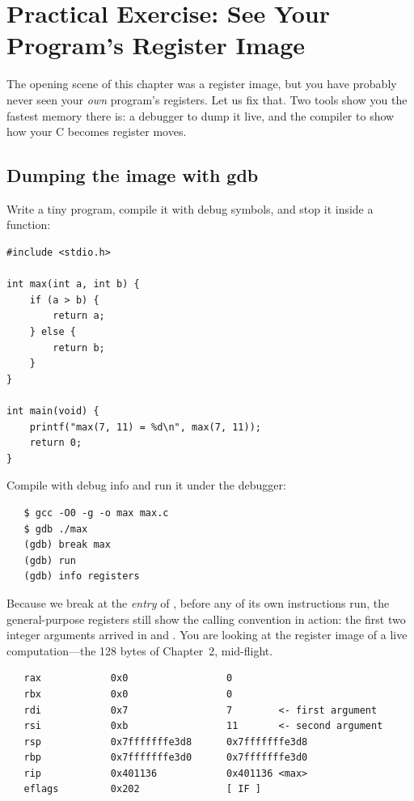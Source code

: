 \section{Practical Exercise: See Your Program's Register Image}
\label{sec:practical}

The opening scene of this chapter was a register image, but you have
probably never seen your \emph{own} program's registers. Let us fix
that. Two tools show you the fastest memory there is: a debugger to
dump it live, and the compiler to show how your C becomes register
moves.

\subsection{Dumping the image with gdb}

Write a tiny program, compile it with debug symbols, and stop it
inside a function:

\begin{lstlisting}[caption={max.c: the function from the previous section.}]
#include <stdio.h>

int max(int a, int b) {
    if (a > b) {
        return a;
    } else {
        return b;
    }
}

int main(void) {
    printf("max(7, 11) = %d\n", max(7, 11));
    return 0;
}
\end{lstlisting}

Compile with debug info and run it under the debugger:

\begin{verbatim}
   $ gcc -O0 -g -o max max.c
   $ gdb ./max
   (gdb) break max
   (gdb) run
   (gdb) info registers
\end{verbatim}

Because we break at the \emph{entry} of , before any of its
own instructions run, the general-purpose registers still show the
calling convention in action: the first two integer arguments arrived
in  and . You are looking at the register image
of a live computation---the 128 bytes of Chapter~2, mid-flight.

\begin{verbatim}
   rax            0x0                 0
   rbx            0x0                 0
   rdi            0x7                 7        <- first argument
   rsi            0xb                 11       <- second argument
   rsp            0x7fffffffe3d8      0x7fffffffe3d8
   rbp            0x7fffffffe3d0      0x7fffffffe3d0
   rip            0x401136            0x401136 <max>
   eflags         0x202               [ IF ]
\end{verbatim}

